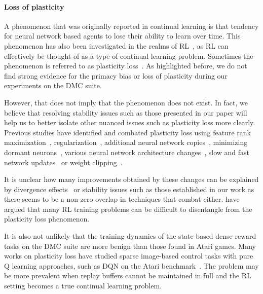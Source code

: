 \paragraph{Loss of plasticity}
A phenomenon that was originally reported in continual learning is that tendency for neural network based agents to lose their ability to learn over time. This phenomenon has also been investigated in the realms of RL~\textcite{igl2021transient}, as RL can effectively be thought of as a type of continual learning problem. Sometimes the phenomenon is referred to as plasticity loss~\textcite{lyle2022understanding, abbas2023loss}. 
As highlighted before, we do not find strong evidence for the primacy bias or loss of plasticity during our experiments on the DMC suite. 

However, that does not imply that the phenomenon does not exist. In fact, we believe that resolving stability issues such as those presented in our paper will help us to better isolate other nuanced issues such as plasticity loss more clearly.
Previous studies have identified and combated plasticity loss using feature rank maximization~\textcite{kumar2021implicit}, regularization~\textcite{lyle2023understanding}, additional neural network copies~\textcite{nikishin2024deep}, minimizing dormant neurons~\textcite{sokar2023dormant, xu2024drm}, various neural network architecture changes~\textcite{lee2023plastic}, slow and fast network updates~\textcite{lee2024slow} or weight clipping~\textcite{elsayed2024weightclipping}. 

It is unclear how many improvements obtained by these changes can be explained by divergence effects~\textcite{hussing2024dissecting} or stability issues such as those established in our work as there seems to be a non-zero overlap in techniques that combat either. 
\textcite{nauman2024overestimation} have argued that many RL training problems can be difficult to disentangle from the plasticity loss phenomenon.

It is also not unlikely that the training dynamics of the state-based dense-reward tasks on the DMC suite are more benign than those found in Atari games. 
Many works on plasticity loss have studied sparse image-based control tasks with pure Q learning approaches, such as DQN on the Atari benchmark~\textcite{sokar2023dormant, lee2024slow}. 
The problem may be more prevalent when replay buffers cannot be maintained in full and the RL setting becomes a true continual learning problem.

